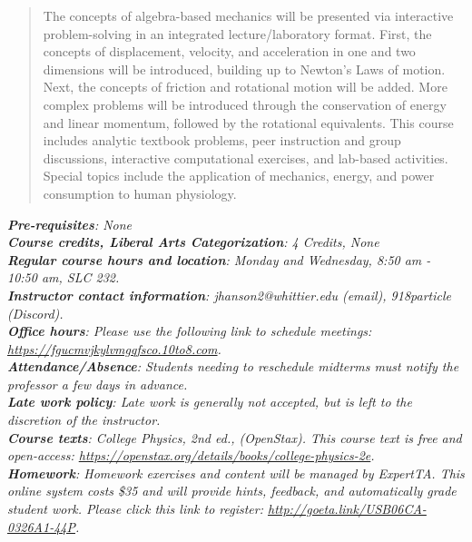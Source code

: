 \documentclass[10pt]{article}
\begin{document}
\maketitle

\begin{abstract}
The concepts of algebra-based mechanics will be presented via interactive problem-solving in an integrated lecture/laboratory format.  First, the concepts of displacement, velocity, and acceleration in one and two dimensions will be introduced, building up to Newton's Laws of motion.  Next, the concepts of friction and rotational motion will be added.  More complex problems will be introduced through the conservation of energy and linear momentum, followed by the rotational equivalents.  This course includes analytic textbook problems, peer instruction and group discussions, interactive computational exercises, and lab-based activities.  Special topics include the application of mechanics, energy, and power consumption to human physiology.
\end{abstract}
\noindent
\textit{\textbf{Pre-requisites}: None} \\
\textit{\textbf{Course credits, Liberal Arts Categorization}: 4 Credits, None} \\
\textit{\textbf{Regular course hours and location}: Monday and Wednesday, 8:50 am - 10:50 am, SLC 232.} \\
\textit{\textbf{Instructor contact information}: jhanson2@whittier.edu (email), 918particle (Discord).} \\
\textit{\textbf{Office hours}: Please use the following link to schedule meetings: \url{https://fgucmvjkylvmgqfsco.10to8.com}.} \\
\textit{\textbf{Attendance/Absence}: Students needing to reschedule midterms must notify the professor a few days in advance.} \\ 
\textit{\textbf{Late work policy}: Late work is generally not accepted, but is left to the discretion of the instructor.} \\
\textit{\textbf{Course texts}: College Physics, 2nd ed., (OpenStax).  This course text is free and open-access: \url{https://openstax.org/details/books/college-physics-2e}.} \\
\textit{\textbf{Homework}: Homework exercises and content will be managed by ExpertTA.  This online system costs \$35 and will provide hints, feedback, and automatically grade student work.  Please click this link to register: \url{http://goeta.link/USB06CA-0326A1-44P}.} \\
\end{document}
